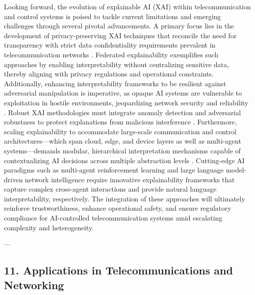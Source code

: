 \documentclass[11pt]{article}
\begin{document}
\begin{itemize}
Looking forward, the evolution of explainable AI (XAI) within telecommunication and control systems is poised to tackle current limitations and emerging challenges through several pivotal advancements. A primary focus lies in the development of privacy-preserving XAI techniques that reconcile the need for transparency with strict data confidentiality requirements prevalent in telecommunication networks \cite{ref48}. Federated explainability exemplifies such approaches by enabling interpretability without centralizing sensitive data, thereby aligning with privacy regulations and operational constraints. Additionally, enhancing interpretability frameworks to be resilient against adversarial manipulation is imperative, as opaque AI systems are vulnerable to exploitation in hostile environments, jeopardizing network security and reliability \cite{ref50}. Robust XAI methodologies must integrate anomaly detection and adversarial robustness to protect explanations from malicious interference \cite{ref54}. Furthermore, scaling explainability to accommodate large-scale communication and control architectures—which span cloud, edge, and device layers as well as multi-agent systems—demands modular, hierarchical interpretation mechanisms capable of contextualizing AI decisions across multiple abstraction levels \cite{ref55}. Cutting-edge AI paradigms such as multi-agent reinforcement learning and large language model-driven network intelligence require innovative explainability frameworks that capture complex cross-agent interactions and provide natural language interpretability, respectively. The integration of these approaches will ultimately reinforce trustworthiness, enhance operational safety, and ensure regulatory compliance for AI-controlled telecommunication systems amid escalating complexity and heterogeneity.


\begin{thebibliography}{00}
\end{thebibliography}

---

\subsection{11. Applications in Telecommunications and Networking}


\end{itemize}
\end{document}

